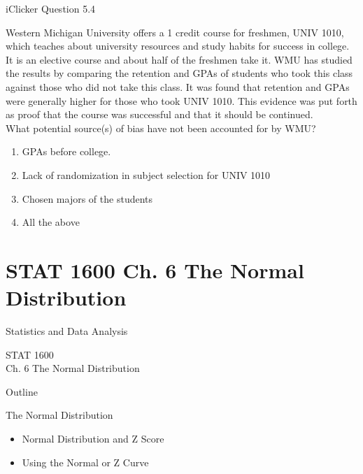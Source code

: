 \documentclass[14pt]{beamer}\usepackage[]{graphicx}\usepackage[]{color}
\begin{document}
\begin{frame}[fragile]{iClicker Question 5.4}

{\footnotesize{
Western Michigan University offers a 1 credit course for freshmen, UNIV 1010, which teaches about university resources and study habits for success in college. It is an elective course and about half of the freshmen take it. WMU has studied the results by comparing the retention and GPAs of students who took this class against those who did not take this class. It was found that retention and GPAs were generally higher for those who took UNIV 1010. This evidence was put forth as proof that the course was successful and that it should be continued. \\
What potential source(s) of bias have not been accounted for by WMU?

\begin{enumerate}
  \item GPAs before college.
  \item Lack of randomization in subject selection for UNIV 1010
  \item Chosen majors of the students
  \item All the above
\end{enumerate}
}}
\end{frame}



\section{STAT 1600 Ch. 6 The Normal Distribution}

\begin{frame}[fragile]{Statistics and Data Analysis}

STAT 1600 \\ Ch. 6 The Normal Distribution

\end{frame}

\begin{frame}[fragile]{Outline}

The Normal Distribution

\begin{itemize}
\item Normal Distribution and Z Score
\item Using the Normal or Z Curve
\end{itemize}
\end{frame}
\end{document}
